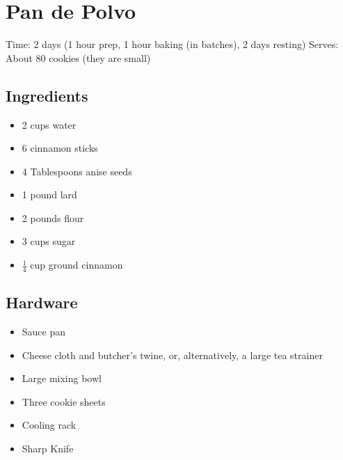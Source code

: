 \section{Pan de Polvo}
\label{panDePolvo}
\setcounter{secnumdepth}{0}
Time: 2 days (1 hour prep, 1 hour baking (in batches), 2 days resting)
Serves: About 80 cookies (they are small)

\begin{multicols}{2}
\subsection*{Ingredients}
\begin{itemize}
    \item 2 cups water
    \item 6 cinnamon sticks
    \item 4 Tablespoons anise seeds
    \item 1 pound lard
    \item 2 pounds flour
    \item 3 cups sugar
    \item \( \frac{1}{4} \) cup ground cinnamon
\end{itemize}

\subsection*{Hardware}
\begin{itemize}
    \item Sauce pan
    \item Cheese cloth and butcher's twine, or, alternatively, a large tea strainer
    \item Large mixing bowl
    \item Three cookie sheets
    \item Cooling rack
    \item Sharp Knife
\end{itemize}
\clearpage


\end{multicols}
